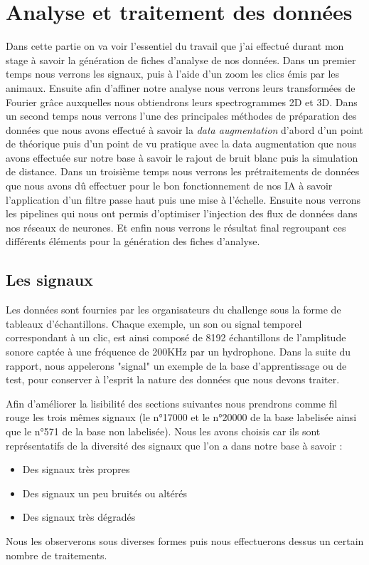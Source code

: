 
\hypertarget{Analyse-et-traitement-des-donnuxe9es}{%
\chapter{Analyse et traitement des données}\label{Analyse-et-traitement-des-donnuxe9es}}

Dans cette partie on va voir l'essentiel du travail que j'ai effectué durant mon stage à savoir la génération de fiches d'analyse de nos données. Dans un premier temps nous verrons les signaux, puis à l'aide d'un zoom les clics émis par les animaux. Ensuite afin d'affiner notre analyse nous verrons leurs transformées de Fourier grâce auxquelles nous obtiendrons leurs spectrogrammes 2D et 3D. Dans un second temps nous verrons l'une des principales méthodes de préparation des données que nous avons effectué à savoir la \textit{data augmentation} d'abord d'un point de  théorique puis d'un point de vu pratique avec la data augmentation que nous avons effectuée sur notre base à savoir le rajout de bruit blanc puis la simulation de distance. Dans un troisième temps nous verrons les prétraitements de données que nous avons dû effectuer pour le bon fonctionnement de nos IA à savoir l'application d'un filtre passe haut puis une mise à l'échelle. Ensuite nous verrons les pipelines qui nous ont permis d'optimiser l'injection des flux de données dans nos réseaux de neurones. Et enfin nous verrons le résultat final regroupant ces différents éléments pour la génération des fiches d'analyse.

\hypertarget{Les-signaux}{%
\section{Les signaux}
\label{Les-signaux}}
Les données sont fournies par les organisateurs du challenge sous la forme de tableaux d'échantillons. Chaque exemple, un son ou signal temporel correspondant à un clic, est ainsi composé de
8192 échantillons de l'amplitude sonore captée à une fréquence de 200KHz par un hydrophone.
Dans la suite du rapport, nous appelerons "signal" un exemple de la base d'apprentissage ou de test, pour conserver à l'esprit la nature des données que nous devons traiter.

Afin d'améliorer la lisibilité des sections suivantes nous prendrons comme fil rouge les trois mêmes signaux (le n°17000 et le n°20000 de la base labelisée ainsi que le n°571 de la base non labelisée).
Nous les avons choisis car ils sont représentatifs de la diversité des signaux que l'on a dans notre base à savoir :
\begin{itemize}
\item Des signaux très propres
\item Des signaux un peu bruités ou altérés
\item Des signaux très dégradés
\end{itemize}
Nous les observerons sous diverses formes puis nous effectuerons dessus un certain nombre de traitements.

